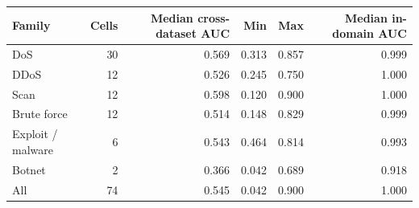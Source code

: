 \begin{tabular}{lrrrrr}
\toprule
Family & Cells & Median cross-dataset AUC & Min & Max & Median in-domain AUC \\
\midrule
DoS & 30 & 0.569 & 0.313 & 0.857 & 0.999 \\
DDoS & 12 & 0.526 & 0.245 & 0.750 & 1.000 \\
Scan & 12 & 0.598 & 0.120 & 0.900 & 1.000 \\
Brute force & 12 & 0.514 & 0.148 & 0.829 & 0.999 \\
Exploit / malware & 6 & 0.543 & 0.464 & 0.814 & 0.993 \\
Botnet & 2 & 0.366 & 0.042 & 0.689 & 0.918 \\
\midrule
All & 74 & 0.545 & 0.042 & 0.900 & 1.000 \\
\bottomrule
\end{tabular}

